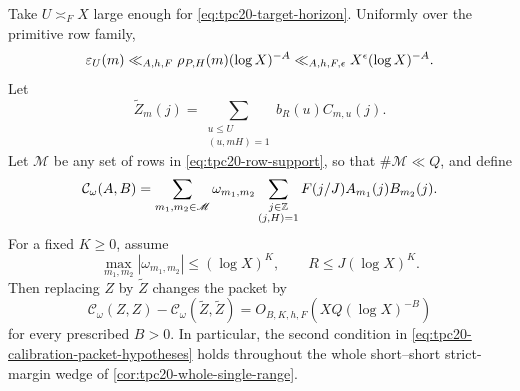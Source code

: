 \begin{corollary}
\label{cor:tpc20-calibration-negligible}
Take \(U\asymp_F X\) large enough for
\eqref{eq:tpc20-target-horizon}.  Uniformly over the primitive row
family,
\begin{equation}
 \varepsilon_U(m)
 \ll_{A,h,F}\rho_{P,H}(m)(\log X)^{-A}
 \ll_{A,h,F,\epsilon}X^\epsilon(\log X)^{-A}.
 \label{eq:tpc20-epsilon-bound}
\end{equation}
Let
\begin{equation}
 \widetilde Z_m(j)
 =\sum_{\substack{u\le U\\(u,mH)=1}}
 b_R(u)C_{m,u}(j).
 \label{eq:tpc20-Z-tilde}
\end{equation}
Let \(\mathscr M\) be any set of rows in
\eqref{eq:tpc20-row-support}, so that \(\#\mathscr M\ll Q\), and define
\[
 \mathcal C_\omega(A,B)
 =\sum_{m_1,m_2\in\mathscr M}\omega_{m_1,m_2}
   \sum_{\substack{j\in\mathbb Z\\(j,H)=1}}
   F(j/J)A_{m_1}(j)B_{m_2}(j).
\]
For a fixed \(K\ge0\), assume
\begin{equation}
 \max_{m_1,m_2}|\omega_{m_1,m_2}|\le(\log X)^K,
 \qquad R\le J(\log X)^K.
 \label{eq:tpc20-calibration-packet-hypotheses}
\end{equation}
Then replacing \(Z\) by \(\widetilde Z\) changes the packet by
\begin{equation}
 \mathcal C_\omega(Z,Z)-\mathcal C_\omega(\widetilde Z,\widetilde Z)
 =O_{B,K,h,F}\!\left(XQ(\log X)^{-B}\right)
 \label{eq:tpc20-calibration-correlation-error}
\end{equation}
for every prescribed \(B>0\).
In particular, the second condition in
\eqref{eq:tpc20-calibration-packet-hypotheses} holds throughout the
whole short--short strict-margin wedge of
\cref{cor:tpc20-whole-single-range}.
\end{corollary}

